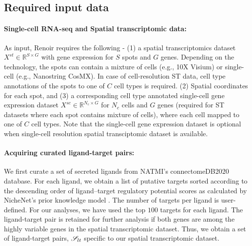 \subsection*{Required input data}
\paragraph{Single-cell RNA-seq and Spatial transcriptomic data:} As input, Renoir requires the following - (1) a spatial transcriptomics dataset $X^{st} \in \mathbb{R}^{S \times G}$ with gene expression for $S$ spots and $G$ genes. Depending on the technology, the spots can contain a mixture of cells (e.g., 10X Visium) or single-cell (e.g., Nanostring CosMX). In case of cell-resolution ST data, cell type annotations of the spots to one of $C$ cell types is required. (2) Spatial coordinates for each spot, and (3) a corresponding cell type annotated single-cell gene expression dataset $X^{sc} \in \mathbb{R}^{N_c \times G}$ for $N_c$ cells and $G$ genes (required for ST datasets where each spot contains mixture of cells), where each cell mapped to one of $C$ cell types. Note that the single-cell gene expression dataset is optional when single-cell resolution spatial transciptomic dataset is available.

\paragraph{Acquiring curated ligand-target pairs:} We first curate a set of secreted ligands from NATMI's connectomeDB2020 \citep{Hou2020} database. For each ligand, we obtain a list of putative targets sorted according to the descending order of ligand–target regulatory potential scores as calculated by NicheNet's prior knowledge model \citep{Browaeys2020}. The number of targets per ligand is user-defined. For our analyses, we have used the top $100$ targets for each ligand. The ligand-target pair is retained for further analysis if both genes are among the highly variable genes in the spatial transcriptomic dataset. Thus, we obtain a set of ligand-target pairs, $\mathcal{S}_{lt}$ specific to our spatial transcriptomic dataset. 


